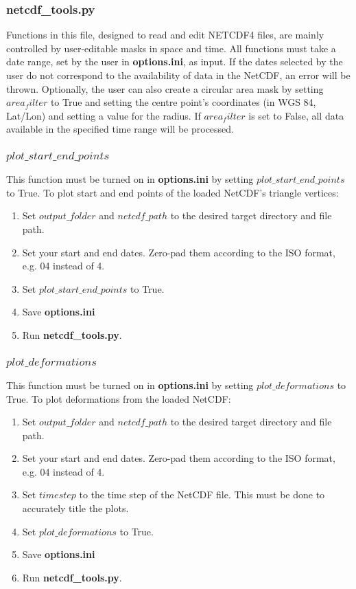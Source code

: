 \documentclass[12pt]{article}
\begin{document}
\subsubsection*{\textbf{netcdf\_tools.py}}

Functions in this file, designed to read and edit NETCDF4 files, are mainly controlled by user-editable masks in space and time. All functions must take a date range, set by the user in \textbf{options.ini}, as input. If the dates selected by the user do not correspond to the availability of data in the NetCDF, an error will be thrown. Optionally, the user can also create a circular area mask by setting $area_filter$ to True and setting the centre point's coordinates (in WGS 84, Lat/Lon) and setting a value for the radius. If $area_filter$ is set to False, all data available in the specified time range will be processed.

\subsubsection*{$plot\_start\_end\_points$}

This function must be turned on in \textbf{options.ini} by setting $plot\_start\_end\_points$ to True. To plot start and end points of the loaded NetCDF's triangle vertices:

\begin{enumerate}
    \item Set $output\_folder$ and $netcdf\_path$ to the desired target directory and file path.
    \item Set your start and end dates. Zero-pad them according to the ISO format, e.g. 04 instead of 4.
    \item Set $plot\_start\_end\_points$ to True.
    \item Save \textbf{options.ini}
    \item Run \textbf{netcdf\_tools.py}.
\end{enumerate}

\subsubsection*{$plot\_deformations$}

This function must be turned on in \textbf{options.ini} by setting $plot\_deformations$ to True. To plot deformations from the loaded NetCDF:

\begin{enumerate}
    \item Set $output\_folder$ and $netcdf\_path$ to the desired target directory and file path.
    \item Set your start and end dates. Zero-pad them according to the ISO format, e.g. 04 instead of 4.
    \item Set $timestep$ to the time step of the NetCDF file. This must be done to accurately title the plots.
    \item Set $plot\_deformations$ to True.
    \item Save \textbf{options.ini}
    \item Run \textbf{netcdf\_tools.py}.
\end{enumerate}
\end{document}
